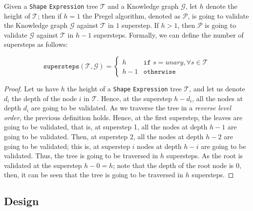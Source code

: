\begin{pseudocode}
    
\end{pseudocode}

\begin{theorem}
    Given a \texttt{Shape} \texttt{Expression} tree $\mathcal{T}$ and a Knowledge graph $\mathcal{G}$, let $h$ denote the height of $\mathcal{T}$; then if $h = 1$ the Pregel algorithm, denoted as $\mathcal{P}$, is going to validate the Knowledge graph $\mathcal{G}$ against $\mathcal{T}$ in $1$ superstep. If $h > 1$, then $\mathcal{P}$ is going to validate $\mathcal{G}$ against $\mathcal{T}$ in $h - 1$ supersteps. Formally, we can define the number of supersteps as follows:

    \begin{equation}
        \texttt{supersteps}(\mathcal{T}, \mathcal{G}) =
        \begin{cases}
            h     & \texttt{if } s = unary, \forall s \in \mathcal{T} \\
            h - 1 & \texttt{otherwise}
        \end{cases}
    \end{equation}
\end{theorem}

\begin{proof}
    Let us have $h$ the height of a \texttt{Shape} \texttt{Expression} tree $\mathcal{T}$, and let us denote $d_i$ the depth of the node $i$ in $\mathcal{T}$. Hence, at the superstep $h - d_i$, all the nodes at depth $d_i$ are going to be validated. As we traverse the tree in a \textit{reverse level order}, the previous definition holds. Hence, at the first superstep, the leaves are going to be validated, that is, at superstep 1, all the nodes at depth $h - 1$ are going to be validated. Then, at superstep 2, all the nodes at depth $h - 2$ are going to be validated; this is, at superstep $i$ nodes at depth $h - i$ are going to be validated. Thus, the tree is going to be traversed in $h$ supersteps. As the root is validated at the superstep $h - 0 = h$; note that the depth of the root node is 0, then, it can be seen that the tree is going to be traversed in $h$ supersteps.
\end{proof}

\subsection{Design}

